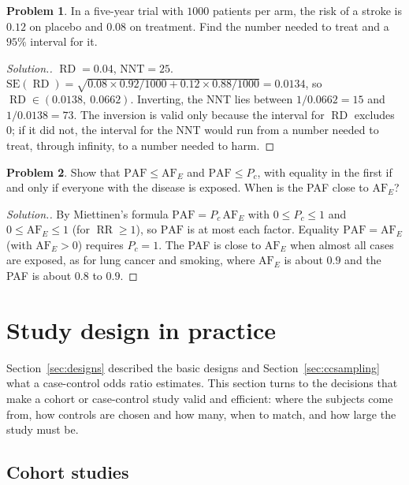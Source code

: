 \documentclass[11pt,a4paper]{article}
\numberwithin{equation}{section}
\DeclareMathOperator{\RR}{RR}
\DeclareMathOperator{\RD}{RD}
\theoremstyle{definition}
\newtheorem{problemx}{Problem}[subsection]
\newenvironment{problem}{\begin{problemx}}{\end{problemx}}
\newenvironment{solution}
  {\renewcommand{\qedsymbol}{}\begin{proof}[\textit{Solution}.]}
  {\end{proof}}
\begin{document}
\begin{problem}
In a five-year trial with $1000$ patients per arm, the risk of a stroke is $0.12$ on placebo and $0.08$ on treatment. Find the number needed
to treat and a $95\%$ interval for it.
\end{problem}

\begin{solution}
$\RD = 0.04$, $\text{NNT} = 25$. $\text{SE}(\RD) = \sqrt{0.08 \times 0.92/1000 + 0.12 \times 0.88/1000} = 0.0134$, so $\RD \in (0.0138,\ 0.0662)$. Inverting, the NNT
lies between $1/0.0662 = 15$ and $1/0.0138 = 73$. The inversion is valid only because the interval for $\RD$ excludes $0$; if it did not, the
interval for the NNT would run from a number needed to treat, through infinity, to a number needed to harm.
\end{solution}

\begin{problem}
Show that $\text{PAF} \leq \text{AF}_E$ and $\text{PAF} \leq P_c$, with equality in the first if and only if everyone with the disease is exposed. When is the PAF close
to $\text{AF}_E$?
\end{problem}

\begin{solution}
By Miettinen's formula $\text{PAF} = P_c\,\text{AF}_E$ with $0 \leq P_c \leq 1$ and $0 \leq \text{AF}_E \leq 1$ (for $\RR \geq 1$), so $\text{PAF}$ is at most each factor. Equality
$\text{PAF} = \text{AF}_E$ (with $\text{AF}_E > 0$) requires $P_c = 1$. The PAF is close to $\text{AF}_E$ when almost all cases are exposed, as for lung cancer and smoking, where
$\text{AF}_E$ is about $0.9$ and the PAF is about $0.8$ to $0.9$.
\end{solution}

\section{Study design in practice}
\label{sec:design}

Section~\ref{sec:designs} described the basic designs and Section~\ref{sec:ccsampling} what a case-control odds ratio estimates. This
section turns to the decisions that make a cohort or case-control study valid and efficient: where the subjects come from, how
controls are chosen and how many, when to match, and how large the study must be.

\subsection{Cohort studies}
\end{document}
